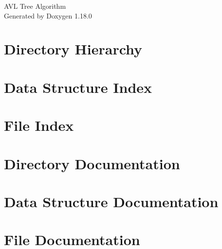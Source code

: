 \documentclass[twoside]{book}
\newcommand{\+}{\discretionary{\mbox{\scriptsize$\hookleftarrow$}}{}{}}
\newcommand{\clearemptydoublepage}{%
    \newpage{\pagestyle{empty}\cleardoublepage}%
  }
\begin{document}
  \raggedbottom
    \hypersetup{pageanchor=false,
                bookmarksnumbered=true,
                pdfencoding=unicode
               }
  \begin{titlepage}
  \vspace*{7cm}
  \begin{center}%
  {\Large AVL Tree Algorithm}\\
  \vspace*{1cm}
  {\large Generated by Doxygen 1.18.0}\\
  \end{center}
  \end{titlepage}
  \clearemptydoublepage
  \tableofcontents
  \clearemptydoublepage
  \hypersetup{pageanchor=true}
\chapter{Directory Hierarchy}

\chapter{Data Structure Index}

\chapter{File Index}

\chapter{Directory Documentation}

\chapter{Data Structure Documentation}


\chapter{File Documentation}

  \backmatter
  \newpage
  \clearemptydoublepage
  \printindex
\end{document}
